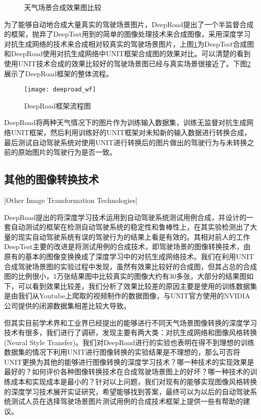 \begin{figure}[h]
    \centering
    \label{deeptest_effect}
    \caption{天气场景合成效果图比较}
\end{figure}

为了能够自动地合成大量真实的驾驶场景图片，DeepRoad提出了一个半监督合成的框架，抛弃了DeepTest用到的简单的图像处理技术来合成图像，采用深度学习对抗生成网络的技术来合成相对较真实的驾驶场景图片，上图\ref{deeptest_effect}为DeepTest合成图和DeepRoad使用对抗生成网络中UNIT\cite{UNIT}框架合成图的效果对比。可以清楚的看到使用UNIT技术合成的效果比较好的驾驶场景图已经与真实场景很接近了。下图\ref{deeproad_wf}展示了DeepRoad框架的整体流程。 

\begin{figure}[h]
    \centering
    \texttt{[image: deeproad\_wf]}
    \caption{DeepRoad框架流程图\cite{DeepRoad}}
    \label{deeproad_wf}
\end{figure}

DeepRoad将两种天气情况下的图片作为训练输入数据集，训练无监督对抗生成网络UNIT\cite{UNIT}框架，然后利用训练好的UNIT框架对未知新的输入数据进行转换合成，最后测试自动驾驶系统对使用UNIT进行转换后的图片做出的驾驶行为与未转换之前的原始图片的驾驶行为是否一致。

\subsection{其他的图像转换技术}[Other Image Transformation Technologies]

DeepRoad提出的将深度学习技术运用到自动驾驶系统测试用例合成，并设计的一套自动测试的框架在检测自动驾驶系统的稳定性和鲁棒性上，在其实验检测出了大量的现实自动驾驶系统有误的驾驶行为的结果\cite{DeepRoad}上看是有效的。其相对前人的工作DeepTest主要的改进是将测试用例的合成技术，即驾驶场景的图像转换技术，由原有的基本的图像变换换成了深度学习中的对抗生成网络技术。我们在利用UNIT合成驾驶场景图的实验过程中发现，虽然有效果比较好的合成图，但其占总的合成图的比例很小，1万张结果图中比较真实的图像大约有30多张，大部分的结果图如下，可以看到效果比较差，我们分析了效果比较差的原因主要是使用的训练数据集是由我们从Youtube上爬取的视频制作的数据图像，与UNIT官方使用的NVIDIA公司提供的闭源数据集相差比较大导致。

但其实目前学术界和工业界已经提出的能够进行不同天气场景图像转换的深度学习技术有很多，我们进行了调研，发现主要有两大类：对抗生成网络和图像风格转换(Neural Style Transfer)。我们对DeepRoad进行的实验也表明在得不到理想的训练数据集的情况下利用UNIT进行图像转换的实验结果是不理想的，那么可否将UNIT更换为其他的能够进行图像转换的深度学习技术？哪一种技术的实现效果是最好的？如何评价各种图像转换技术在合成驾驶场景图上的好坏？哪一种技术的训练成本和实现成本是最小的？针对以上问题，我们对现有的能够实现图像风格转换的深度学习技术展开实证研究，希望能够找到答案，最终可以为以后的自动驾驶系统测试人员在选择驾驶场景图片测试用例的合成技术框架上提供一些有帮助的建议。

